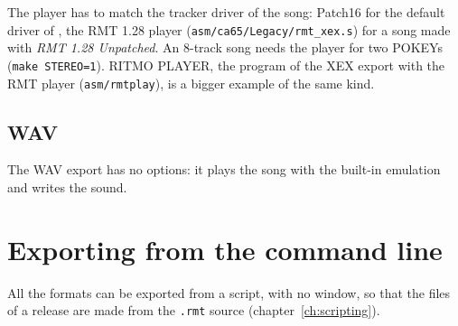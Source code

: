 The player has to match the tracker driver of the song: Patch16 for the default driver of \RITMO{}, the RMT 1.28 player
(\texttt{asm/ca65/Legacy/rmt\_xex.s}) for a song made with \emph{RMT 1.28 Unpatched}. An 8-track song needs the player for two
POKEYs (\texttt{make STEREO=1}). RITMO PLAYER, the program of the XEX export with the RMT player (\texttt{asm/rmtplay}), is a bigger
example of the same kind.

\subsection{WAV}

The WAV export has no options: it plays the song with the built-in emulation and writes the sound.

\section{Exporting from the command line}

All the formats can be exported from a script, with no window, so that the files of a release are made from the \texttt{.rmt}
source (chapter~\ref{ch:scripting}).
